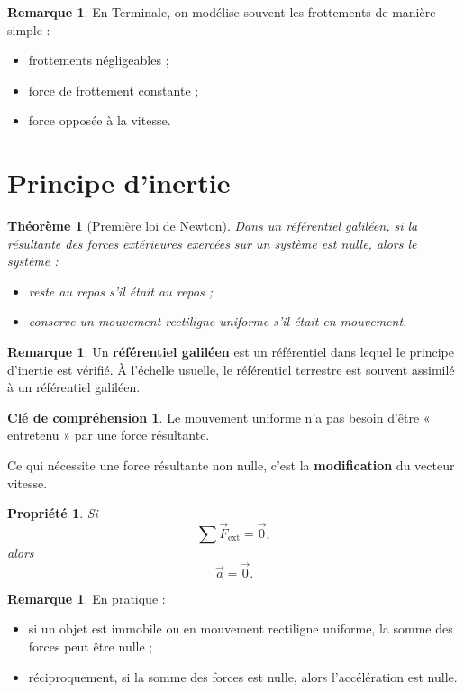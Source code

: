 \documentclass[11pt,a4paper]{article}
\theoremstyle{definition}
\newtheorem{remarque}[definition]{Remarque}
\newtheorem{interpretation}[definition]{Clé de compréhension}
\theoremstyle{plain}
\newtheorem{propriete}[definition]{Propriété}
\newtheorem{theoreme}[definition]{Théorème}
\theoremstyle{remark}
\begin{document}
\begin{remarque}
En Terminale, on modélise souvent les frottements de manière simple :
\begin{itemize}
    \item frottements négligeables ;
    \item force de frottement constante ;
    \item force opposée à la vitesse.
\end{itemize}
\end{remarque}

\section{Principe d'inertie}

\begin{theoreme}[Première loi de Newton]
Dans un référentiel galiléen, si la résultante des forces extérieures exercées sur un système est nulle, alors le système :
\begin{itemize}
    \item reste au repos s'il était au repos ;
    \item conserve un mouvement rectiligne uniforme s'il était en mouvement.
\end{itemize}
\end{theoreme}

\begin{remarque}
Un \textbf{référentiel galiléen} est un référentiel dans lequel le principe d'inertie est vérifié. À l'échelle usuelle, le référentiel terrestre est souvent assimilé à un référentiel galiléen.
\end{remarque}

\begin{interpretation}
Le mouvement uniforme n'a pas besoin d'être « entretenu » par une force résultante.  

Ce qui nécessite une force résultante non nulle, c'est la \textbf{modification} du vecteur vitesse.
\end{interpretation}

\begin{propriete}
Si
\[
\sum \vec{F}_{\text{ext}}=\vec{0},
\]
alors
\[
\vec{a}=\vec{0}.
\]
\end{propriete}

\begin{remarque}
En pratique :
\begin{itemize}
    \item si un objet est immobile ou en mouvement rectiligne uniforme, la somme des forces peut être nulle ;
    \item réciproquement, si la somme des forces est nulle, alors l'accélération est nulle.
\end{itemize}
\end{remarque}
\end{document}

